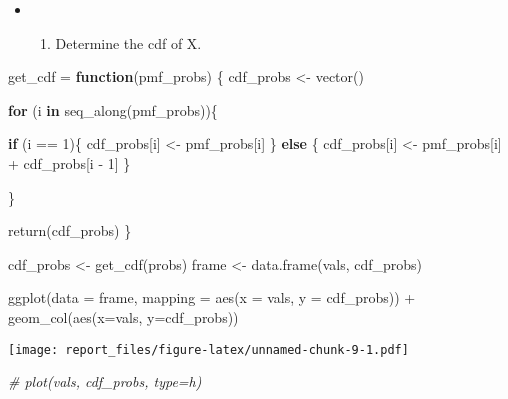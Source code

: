 \documentclass[
]{article}
\newenvironment{Shaded}{\begin{snugshade}}{\end{snugshade}}
\newcommand{\AttributeTok}[1]{\textcolor[rgb]{0.77,0.63,0.00}{#1}}
\newcommand{\CommentTok}[1]{\textcolor[rgb]{0.56,0.35,0.01}{\textit{#1}}}
\newcommand{\ControlFlowTok}[1]{\textcolor[rgb]{0.13,0.29,0.53}{\textbf{#1}}}
\newcommand{\DecValTok}[1]{\textcolor[rgb]{0.00,0.00,0.81}{#1}}
\newcommand{\FunctionTok}[1]{\textcolor[rgb]{0.00,0.00,0.00}{#1}}
\newcommand{\NormalTok}[1]{#1}
\newcommand{\OtherTok}[1]{\textcolor[rgb]{0.56,0.35,0.01}{#1}}
\newcommand{\SpecialCharTok}[1]{\textcolor[rgb]{0.00,0.00,0.00}{#1}}
\providecommand{\tightlist}{%
  \setlength{\itemsep}{0pt}\setlength{\parskip}{0pt}}
\begin{document}
\hfill\break

\begin{itemize}
\item
  \begin{enumerate}
  \def\labelenumi{\alph{enumi})}
  \setcounter{enumi}{1}
  \tightlist
  \item
    Determine the cdf of X.
  \end{enumerate}
\end{itemize}

\begin{Shaded}
\begin{Highlighting}[]
\NormalTok{get\_cdf }\OtherTok{=} \ControlFlowTok{function}\NormalTok{(pmf\_probs) \{}
\NormalTok{  cdf\_probs }\OtherTok{\textless{}{-}} \FunctionTok{vector}\NormalTok{()}
  
  \ControlFlowTok{for}\NormalTok{ (i }\ControlFlowTok{in} \FunctionTok{seq\_along}\NormalTok{(pmf\_probs))\{}
    
    \ControlFlowTok{if}\NormalTok{ (i }\SpecialCharTok{==} \DecValTok{1}\NormalTok{)\{}
\NormalTok{      cdf\_probs[i] }\OtherTok{\textless{}{-}}\NormalTok{ pmf\_probs[i]}
\NormalTok{    \} }\ControlFlowTok{else}\NormalTok{ \{}
\NormalTok{      cdf\_probs[i] }\OtherTok{\textless{}{-}}\NormalTok{ pmf\_probs[i] }\SpecialCharTok{+}\NormalTok{ cdf\_probs[i }\SpecialCharTok{{-}} \DecValTok{1}\NormalTok{]}
\NormalTok{    \}}
    
\NormalTok{  \}}
  
  \FunctionTok{return}\NormalTok{(cdf\_probs)}
\NormalTok{\}}

\NormalTok{cdf\_probs }\OtherTok{\textless{}{-}} \FunctionTok{get\_cdf}\NormalTok{(probs)}
\NormalTok{frame }\OtherTok{\textless{}{-}} \FunctionTok{data.frame}\NormalTok{(vals, cdf\_probs)}

\FunctionTok{ggplot}\NormalTok{(}\AttributeTok{data =}\NormalTok{ frame,}
        \AttributeTok{mapping =} \FunctionTok{aes}\NormalTok{(}\AttributeTok{x =}\NormalTok{ vals, }\AttributeTok{y =}\NormalTok{ cdf\_probs)) }\SpecialCharTok{+} \FunctionTok{geom\_col}\NormalTok{(}\FunctionTok{aes}\NormalTok{(}\AttributeTok{x=}\NormalTok{vals, }\AttributeTok{y=}\NormalTok{cdf\_probs))}
\end{Highlighting}
\end{Shaded}

\texttt{[image: report\_files/figure-latex/unnamed-chunk-9-1.pdf]}

\begin{Shaded}
\begin{Highlighting}[]
\CommentTok{\# plot(vals, cdf\_probs, type=\textquotesingle{}h\textquotesingle{})}
\end{Highlighting}
\end{Shaded}
\end{document}
